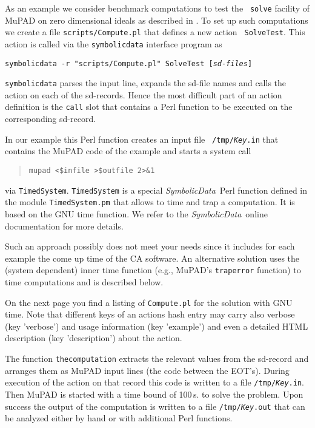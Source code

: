 \documentclass[11pt]{article}
\newcommand{\SD}{{\em Symbo\-lic\-Data}}
\begin{document}
As an example we consider benchmark computations to test the {\tt
solve} facility of MuPAD on zero dimensional ideals as described
in \cite{Graebe_99b}.  To set up such computations we create a
file {\tt scripts/Compute.pl} that defines a new action {\tt
SolveTest}. This action is called via the {\tt symbolicdata}
interface program as 
\begin{center}
\tt symbolicdata -r "scripts/Compute.pl" SolveTest [{\it sd-files}]
\end{center}
{\tt symbolicdata} parses the input line, expands the sd-file
names and calls the action on each of the sd-records.  Hence the
most difficult part of an action definition is the {\tt call}
slot that contains a Perl function to be executed on the
corresponding sd-record.

In our example this Perl function creates an input file {\tt
/tmp/{\it Key}.in} that contains the MuPAD code of the example
and starts a system call
\begin{quote}\tt mupad <\$infile >\$outfile 2>\&1\end{quote}
via {\tt TimedSystem}. {\tt TimedSystem} is a special \SD\ Perl
function defined in the module {\tt TimedSystem.pm} that allows to
time and trap a computation. It is based on the GNU {time} function.
We refer to the \SD\ online documentation for more details.

Such an approach possibly does not meet your needs since it includes
for each example the come up time of the CA software. An alternative
solution uses the (system dependent) inner time function (e.g.,
MuPAD's {\tt traperror} function) to time computations and is
described below.

On the next page you find a listing of {\tt Compute.pl} for the
solution with GNU {time}. Note that different keys of an actions hash
entry may carry also verbose (key 'verbose') and usage information
(key 'example') and even a detailed HTML description (key
'description') about the action. 

The function {\tt thecomputation} extracts the relevant values from
the sd-record and arranges them as MuPAD input lines (the code between
the EOT's). During execution of the action on that record this code is
written to a file {\tt /tmp/{\it Key}.in}. Then MuPAD is started with
a time bound of 100\,s. to solve the problem.  Upon success the output
of the computation is written to a file {\tt /tmp/{\it Key}.out}
that can be analyzed either by hand or with additional Perl functions.
\end{document}
